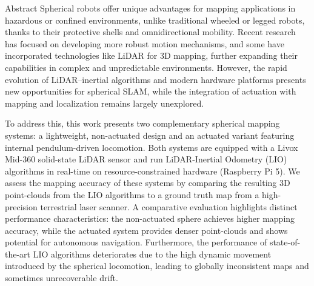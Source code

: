 \documentclass[english, bachelor, utf8]{base/thesis_telematics}
\begin{document}
\begin{prefacesection}{Abstract}
Spherical robots offer unique advantages for mapping applications in hazardous or confined environments, unlike traditional wheeled or legged robots, thanks to their protective shells and omnidirectional mobility. 
Recent research has focused on developing more robust motion mechanisms, and some have incorporated technologies like LiDAR for 3D mapping, further expanding their capabilities in complex and unpredictable environments. 
However, the rapid evolution of LiDAR–inertial algorithms and modern hardware platforms presents new opportunities for spherical SLAM, while the integration of actuation with mapping and localization remains largely unexplored.

To address this, this work presents two complementary spherical mapping systems: a lightweight, non-actuated design and an actuated variant featuring internal pendulum-driven locomotion. 
Both systems are equipped with a Livox Mid-360 solid-state LiDAR sensor and run LiDAR-Inertial Odometry (LIO) algorithms in real-time on resource-constrained hardware (Raspberry Pi 5). 
We assess the mapping accuracy of these systems by comparing the resulting 3D point-clouds from the LIO algorithms to a ground truth map from a high-precision terrestrial laser scanner.
A comparative evaluation highlights distinct performance characteristics: the non-actuated sphere achieves higher mapping accuracy, while the actuated system provides denser point-clouds and shows potential for autonomous navigation. 
Furthermore, the performance of state-of-the-art LIO algorithms deteriorates due to the high dynamic movement introduced by the spherical locomotion, leading to globally inconsistent maps and sometimes unrecoverable drift.
\end{prefacesection}
\cleardoublepage
\tableofcontents

\thispagestyle{empty}
\listoffigures
\listoftables
\newpage
{}

\startTextChapters %
\end{document}

